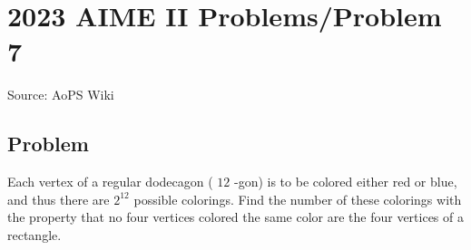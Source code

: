 \documentclass[12pt]{article}
\begin{document}
\section*{{2023 AIME II Problems/Problem 7}}
Source: AoPS Wiki

\subsection*{Problem}
Each vertex of a regular dodecagon ( $12$ -gon) is to be colored either red or blue, and thus there are $2^{12}$ possible colorings. Find the number of these colorings with the property that no four vertices colored the same color are the four vertices of a rectangle.
\end{document}
